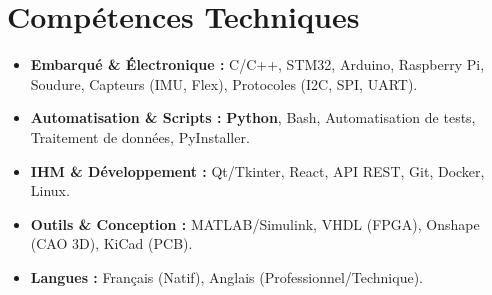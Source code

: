 \documentclass[a4paper,11pt]{article}
\begin{document}
\section{Compétences Techniques}
\begin{itemize}[leftmargin=*, nosep]
    \item \small{\textbf{Embarqué \& Électronique :} C/C++, STM32, Arduino, Raspberry Pi, Soudure, Capteurs (IMU, Flex), Protocoles (I2C, SPI, UART).}
    \item \small{\textbf{Automatisation \& Scripts :} \textbf{Python}, Bash, Automatisation de tests, Traitement de données, PyInstaller.}
    \item \small{\textbf{IHM \& Développement :} Qt/Tkinter, React, API REST, Git, Docker, Linux.}
    \item \small{\textbf{Outils \& Conception :} MATLAB/Simulink, VHDL (FPGA), Onshape (CAO 3D), KiCad (PCB).}
    \item \small{\textbf{Langues :} Français (Natif), Anglais (Professionnel/Technique).}
\end{itemize}

\end{document}
